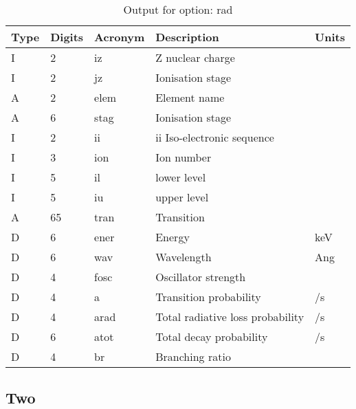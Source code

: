 \begin{table}[!p]
\caption{Output for option: rad}
\label{tabout:rad}
\begin{tabular}{lllll}
\hline
Type & Digits & Acronym & Description & Units \\ 
\hline
I &  2 & iz   & Z nuclear charge                 &                  \\
I &  2 & jz   & Ionisation stage                 &                  \\
A &  2 & elem & Element name                     &                  \\
A &  6 & stag & Ionisation stage                 &                  \\
I &  2 & ii   & ii Iso-electronic sequence       &                  \\
I &  3 & ion  & Ion number                       &                  \\
I &  5 & il   & lower level                      &                  \\
I &  5 & iu   & upper level                      &                  \\
A & 65 & tran & Transition                       &                  \\
D &  6 & ener & Energy                           & keV              \\
D &  6 & wav  & Wavelength                       & Ang              \\
D &  4 & fosc & Oscillator strength              &                  \\
D &  4 & a    & Transition probability           & /s               \\
D &  4 & arad & Total radiative loss probability & /s               \\
D &  6 & atot & Total decay probability          & /s               \\
D &  4 & br   & Branching ratio                  &                  \\
\hline
\end{tabular}
\end{table}

\subsection{Two}

